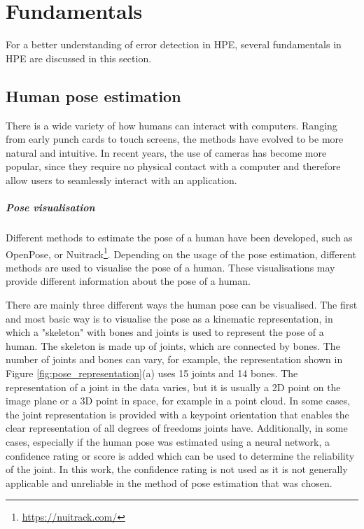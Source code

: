 \chapter{Fundamentals}
\label{sec:fundamentals}

For a better understanding of error detection in HPE, several fundamentals in HPE are discussed in this section. 

\section{Human pose estimation}

There is a wide variety of how humans can interact with computers. Ranging from early punch cards to touch screens, the methods have evolved to be more natural and intuitive. In recent years, the use of cameras has become more popular, since they require no physical contact with a computer and therefore allow users to seamlessly interact with an application.

\paragraph{Pose visualisation}

Different methods to estimate the pose of a human have been developed, such as OpenPose\cite{OpenPosePose}, or Nuitrack\footnote{\url{https://nuitrack.com/}}. Depending on the usage of the pose estimation, different methods are used to visualise the pose of a human. These visualisations may provide different information about the pose of a human.

There are mainly three different ways the human pose can be visualised. The first and most basic way is to visualise the pose as a kinematic representation, in which a "skeleton" with bones and joints is used to represent the pose of a human. The skeleton is made up of joints, which are connected by bones. The number of joints and bones can vary, for example, the representation shown in Figure \ref{fig:pose_representation}(a) uses 15 joints and 14 bones. The representation of a joint in the data varies, but it is usually a 2D point on the image plane or a 3D point in space, for example in a point cloud. In some cases, the joint representation is provided with a keypoint orientation that enables the clear representation of all degrees of freedoms joints have\cite{KeypointOrientation}. Additionally, in some cases, especially if the human pose was estimated using a neural network, a confidence rating or score is added which can be used to determine the reliability of the joint. In this work, the confidence rating is not used as it is not generally applicable and unreliable in the method of pose estimation that was chosen.

